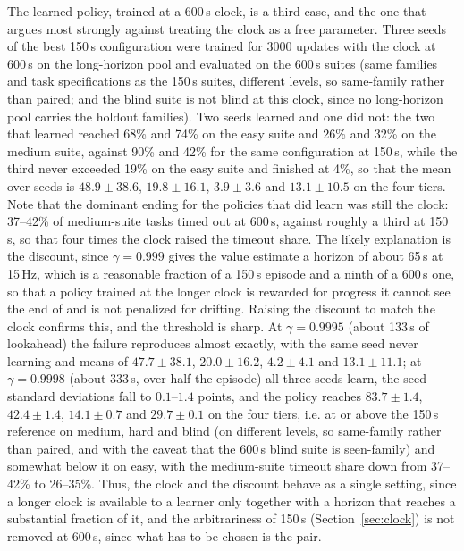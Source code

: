 The learned policy, trained at a 600\,s clock, is a third case, and the one
that argues most strongly against treating the clock as a free parameter.
Three seeds of the best 150\,s configuration were trained for 3000 updates
with the clock at 600\,s on the long-horizon pool and evaluated on the 600\,s
suites (same families and task specifications as the 150\,s suites, different
levels, so same-family rather than paired; and the blind suite is not blind
at this clock, since no long-horizon pool carries the holdout families). Two
seeds learned and one did not: the two that learned reached 68\% and 74\% on
the easy suite and 26\% and 32\% on the medium suite, against 90\% and 42\%
for the same configuration at 150\,s, while the third never exceeded 19\% on
the easy suite and finished at 4\%, so that the mean over seeds is
$48.9 \pm 38.6$, $19.8 \pm 16.1$, $3.9 \pm 3.6$ and $13.1 \pm 10.5$ on the
four tiers. Note that the dominant ending for the policies that did learn
was still the clock: 37--42\% of medium-suite tasks timed out at 600\,s,
against roughly a third at 150\,s, so that four times the clock raised the
timeout share. The likely explanation is the discount, since
$\gamma = 0.999$ gives the value estimate a horizon of about 65\,s at
15\,Hz, which is a reasonable fraction of a 150\,s episode and a ninth of a
600\,s one, so that a policy trained at the longer clock is rewarded for
progress it cannot see the end of and is not penalized for drifting. Raising the discount to match the clock confirms this, and
the threshold is sharp. At $\gamma = 0.9995$ (about 133\,s of lookahead) the
failure reproduces almost exactly, with the same seed never learning and
means of $47.7 \pm 38.1$, $20.0 \pm 16.2$, $4.2 \pm 4.1$ and $13.1 \pm 11.1$;
at $\gamma = 0.9998$ (about 333\,s, over half the episode) all three seeds
learn, the seed standard deviations fall to $0.1$--$1.4$ points, and the
policy reaches $83.7 \pm 1.4$, $42.4 \pm 1.4$, $14.1 \pm 0.7$ and
$29.7 \pm 0.1$ on the four tiers, i.e. at or above the 150\,s reference on
medium, hard and blind (on different levels, so same-family rather than
paired, and with the caveat that the 600\,s blind suite is seen-family) and
somewhat below it on easy, with the medium-suite timeout share down from
37--42\% to 26--35\%. Thus, the clock and the discount behave as a single
setting, since a longer clock is available to a learner only together with a
horizon that reaches a substantial fraction of it, and the arbitrariness of 150\,s (Section~\ref{sec:clock}) is not
removed at 600\,s, since what has to be chosen is the pair.

